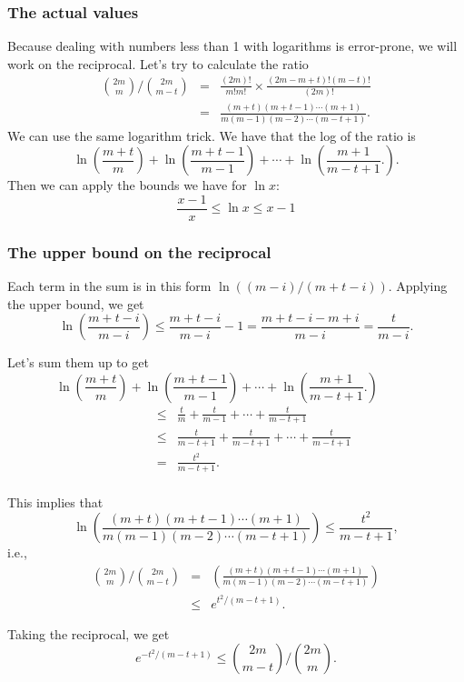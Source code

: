 \begin{frame}\frametitle{The actual values}
  Because dealing with numbers less than 1 with logarithms is
  error-prone, we will work on the reciprocal.  Let's try to calculate
  the ratio
  \begin{eqnarray*}
    \binom{2m}{m}\Big/\binom{2m}{m-t}
    &=&
    \frac{(2m)!}{m!m!}\times\frac{(2m-m+t)!(m-t)!}{(2m)!}\\
    &=&
    \frac{(m+t)(m+t-1)\cdots(m+1)}{m(m-1)(m-2)\cdots(m-t+1)}.
  \end{eqnarray*}
  \pause
  We can use the same logarithm trick.  We have that the log of the
  ratio is
  \[
  \ln\left(\frac{m+t}{m}\right) +
  \ln\left(\frac{m+t-1}{m-1}\right)+\cdots+
  \ln\left(\frac{m+1}{m-t+1}.\right).
  \]
  \pause
  Then we can apply the bounds we have for $\ln x$:
  \[
  \frac{x-1}{x}\leq \ln x \leq x - 1
  \]
\end{frame}

\begin{frame}\frametitle{The upper bound on the reciprocal}
  Each term in the sum is in this form $\ln((m-i)/(m+t-i))$.  Applying
  the upper bound, we get
  \[ \ln\left(\frac{m+t-i}{m-i}\right) \leq \frac{m+t-i}{m-i}-1 = \frac{m+t-i-m+i}{m-i}=\frac{t}{m-i}.\]
  \pause

  Let's sum them up to get
  \[
    \ln\left(\frac{m+t}{m}\right) +
    \ln\left(\frac{m+t-1}{m-1}\right)+\cdots+
    \ln\left(\frac{m+1}{m-t+1}.\right) \quad\quad\quad
  \]
  \begin{eqnarray*}
    \quad\quad &\leq&
    \frac{t}{m} + \frac{t}{m-1} + \cdots + \frac{t}{m-t+1} \\
    &\leq&
    \frac{t}{m-t+1} + \frac{t}{m-t+1} + \cdots + \frac{t}{m-t+1} \\
    & = & \frac{t^2}{m-t+1}. \\
  \end{eqnarray*}
\end{frame}

\begin{frame}
  This implies that
  \[
  \ln\left(\frac{(m+t)(m+t-1)\cdots(m+1)}{m(m-1)(m-2)\cdots(m-t+1)}\right)
  \leq \frac{t^2}{m-t+1},
  \]
  i.e.,
  \begin{eqnarray*}
    \binom{2m}{m}\Big/\binom{2m}{m-t} &=& 
    \left(\frac{(m+t)(m+t-1)\cdots(m+1)}{m(m-1)(m-2)\cdots(m-t+1)}\right)\\
    &\leq& e^{t^2/(m-t+1)}.
  \end{eqnarray*}
  \pause

  Taking the reciprocal, we get
  \[
  e^{-t^2/(m-t+1)}\leq
  \binom{2m}{m-t}\Big/\binom{2m}{m}.
  \]
\end{frame}

